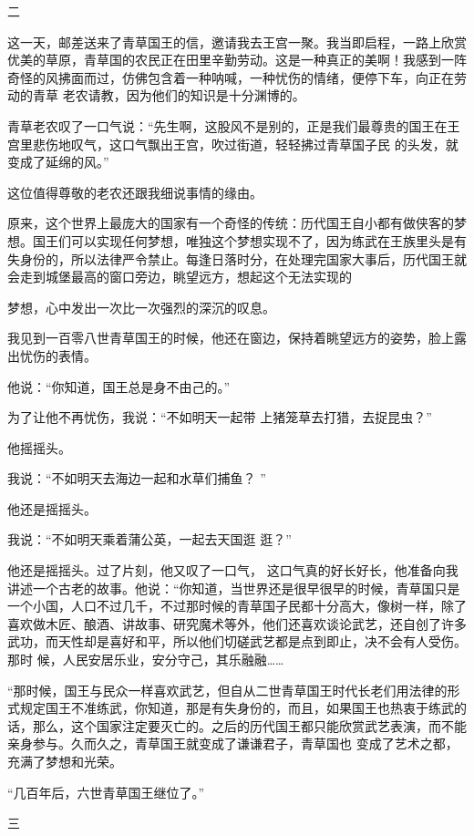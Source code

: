 \documentclass{article}
\begin{document}
二 

\newpage

这一天，邮差送来了青草国王的信，邀请我去王宫一聚。我当即启程，一路上欣赏优美的草原，青草国的农民正在田里辛勤劳动。这是一种真正的美啊！我感到一阵奇怪的风拂面而过，仿佛包含着一种呐喊，一种忧伤的情绪，便停下车，向正在劳动的青草
老农请教，因为他们的知识是十分渊博的。 

青草老农叹了一口气说：“先生啊，这股风不是别的，正是我们最尊贵的国王在王宫里悲伤地叹气，这口气飘出王宫，吹过街道，轻轻拂过青草国子民
的头发，就变成了延绵的风。” 

这位值得尊敬的老农还跟我细说事情的缘由。
 

原来，这个世界上最庞大的国家有一个奇怪的传统：历代国王自小都有做侠客的梦想。国王们可以实现任何梦想，唯独这个梦想实现不了，因为练武在王族里头是有失身份的，所以法律严令禁止。每逢日落时分，在处理完国家大事后，历代国王就会走到城堡最高的窗口旁边，眺望远方，想起这个无法实现的
\newpage

梦想，心中发出一次比一次强烈的深沉的叹息。 

我见到一百零八世青草国王的时候，他还在窗边，保持着眺望远方的姿势，脸上露出忧伤的表情。


他说：“你知道，国王总是身不由己的。” 

为了让他不再忧伤，我说：“不如明天一起带
上猪笼草去打猎，去捉昆虫？” 


他摇摇头。 

我说：“不如明天去海边一起和水草们捕鱼？
” 


他还是摇摇头。 

我说：“不如明天乘着蒲公英，一起去天国逛
逛？” 

他还是摇摇头。过了片刻，他又叹了一口气，
\newpage
这口气真的好长好长，他准备向我讲述一个古老的故事。他说：“你知道，当世界还是很早很早的时候，青草国只是一个小国，人口不过几千，不过那时候的青草国子民都十分高大，像树一样，除了喜欢做木匠、酿酒、讲故事、研究魔术等外，他们还喜欢谈论武艺，还自创了许多武功，而天性却是喜好和平，所以他们切磋武艺都是点到即止，决不会有人受伤。那时
候，人民安居乐业，安分守己，其乐融融…… 

“那时候，国王与民众一样喜欢武艺，但自从二世青草国王时代长老们用法律的形式规定国王不准练武，你知道，那是有失身份的，而且，如果国王也热衷于练武的话，那么，这个国家注定要灭亡的。之后的历代国王都只能欣赏武艺表演，而不能亲身参与。久而久之，青草国王就变成了谦谦君子，青草国也
变成了艺术之都，充满了梦想和光荣。 


“几百年后，六世青草国王继位了。” 


三 
\end{document}
